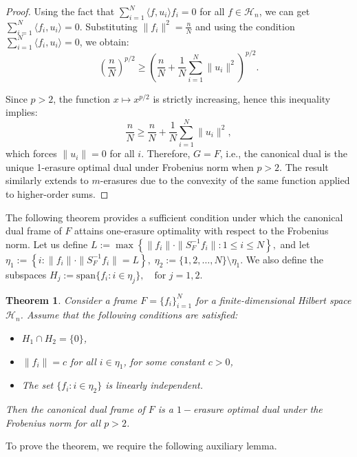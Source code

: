 \documentclass[final,1p,times]{elsarticle}
\newtheorem{thm}{Theorem}[section]
\begin{document}
\begin{proof}
Using the fact that \( \sum_{i=1}^N \langle f, u_i \rangle f_i = 0 \) for all \( f \in \mathcal{H}_n \), we can get \( \sum_{i=1}^N \langle f_i, u_i \rangle = 0 .\)  Substituting \( \|f_i\|^2 = \frac{n}{N} \) and using the  condition  $\sum_{i=1}^N \langle f_i, u_i \rangle = 0 $, we obtain:
\[
\left( \frac{n}{N} \right)^{p/2} \geq \left( \frac{n}{N} + \frac{1}{N} \sum_{i=1}^N \|u_i\|^2 \right)^{p/2}.
\]

Since \( p > 2 \), the function \( x \mapsto x^{p/2} \) is strictly increasing, hence this inequality implies:
\[
\frac{n}{N} \geq \frac{n}{N} + \frac{1}{N} \sum_{i=1}^N \|u_i\|^2,
\]
which forces \( \|u_i\| = 0 \) for all \( i \). Therefore, \( G = F \), i.e., the canonical dual is the unique 1-erasure optimal dual under Frobenius norm when \( p > 2 \). The result similarly extends to \( m \)-erasures due to the convexity of the same function applied to higher-order sums.
\end{proof}












The following theorem provides a sufficient condition under which the canonical dual frame of $F$ attains one-erasure optimality with respect to the Frobenius norm. Let us define
$L := \max \left\{ \|f_i\| \cdot \|S_F^{-1} f_i\| : 1 \leq i \leq N \right\},$
and let $\eta_1 := \left\{ i : \|f_i\| \cdot \|S_F^{-1} f_i\| = L \right\}, \; \eta_2 := \{1,2,\ldots,N\} \setminus \eta_1.$ We also define the subspaces $H_j := \mathrm{span} \{ f_i : i \in \eta_j \}, \quad \text{for } j = 1,2.$

\begin{thm}\label{thm3point2}
Consider a frame \( F = \{f_i\}_{i=1}^N \) for a finite-dimensional Hilbert space \( \mathcal{H}_n \). Assume that the following conditions are satisfied:
\begin{itemize}
    \item [{\em (i)}]\( H_1 \cap H_2 = \{0\} \),
    \item [{\em (ii)}]\( \|f_i\| = c \) for all \( i \in \eta_1 \), for some constant \( c > 0 \),
    \item [{\em (iii)}]The set \( \{f_i : i \in \eta_2\} \) is linearly independent.
\end{itemize}
Then the canonical dual frame of \( F \) is a $1-$erasure optimal dual under the Frobenius norm for all \( p > 2 \).
\end{thm}
To prove the theorem, we require the following auxiliary lemma.
\end{document}
